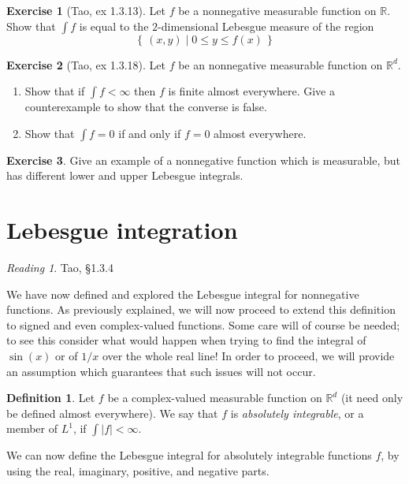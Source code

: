 \documentclass[10pt,oneside]{amsbook}
\newcommand{\set}[1]{\left\{\,#1\,\right\}}
\newcommand{\RR}{{\mathbb R}}
\theoremstyle{definition}
\newtheorem{exerc}{Exercise}[section]
\theoremstyle{plain}
\theoremstyle{definition}
\newtheorem{defn}[thm]{Definition}
\theoremstyle{remark}
\newtheorem*{reading}{Reading}
\numberwithin{equation}{section}
\numberwithin{figure}{section}
\begin{document}
\begin{exerc}[Tao, ex 1.3.13]
  Let $f$ be a nonnegative measurable function on $\RR$. Show that $\int f$ is equal to the $2$-dimensional Lebesgue measure of the region
  \[\set{(x,y)\mid 0\leq y\leq f(x)}
  \]
\end{exerc}

\begin{exerc}[Tao, ex 1.3.18]
  Let $f$ be an nonnegative measurable function on $\RR^d$.
  \begin{enumerate}
    \item Show that if $\int f<\infty$ then $f$ is finite almost everywhere. Give a counterexample to show that the converse is false.
    \item Show that $\int f=0$ if and only if $f=0$ almost everywhere.
  \end{enumerate}
\end{exerc}

\begin{exerc}
  Give an example of a nonnegative function which is measurable, but has different lower and upper Lebesgue integrals.
\end{exerc}

\newpage
\section{Lebesgue integration}

\begin{reading}
  Tao, \S 1.3.4
\end{reading}

We have now defined and explored the Lebesgue integral for nonnegative functions. As previously explained, we will now proceed to extend this definition to signed and even complex-valued functions. Some care will of course be needed; to see this consider what would happen when trying to find the integral of $\sin(x)$ or of $1/x$ over the whole real line! In order to proceed, we will provide an assumption which guarantees that such issues will not occur.

\begin{defn}
  Let $f$ be a complex-valued measurable function on $\RR^d$ (it need only be defined almost everywhere). We say that $f$ is \emph{absolutely integrable}, or a member of $L^1$, if $\int|f|<\infty$.
\end{defn}

We can now define the Lebesgue integral for absolutely integrable functions $f$, by using the real, imaginary, positive, and negative parts.
\end{document}
